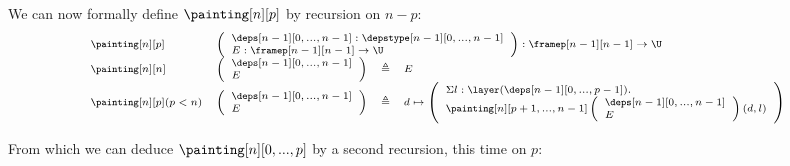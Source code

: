 \documentclass{msc}
\newcommand{\defeq}{\ensuremath{\triangleq}}
\begin{document}
We can now formally define $\painting[n][p]$ by recursion on $n-p$:
\begin{equation*}
  \fontsize{7.2}{9}\selectfont
  \begin{array}{llcl}
    \painting[n][p]          &
    \multicolumn{3}{l}{
      \left(\begin{array}{l}
                \deps[n-1][0,...,n-1]:\depstype[n-1][0,...,n-1] \\
                E:\framep[n-1][n-1]\rightarrow \U               \\
              \end{array}\right) : \framep[n-1][n-1]\rightarrow \U
    }                                                            \\
    \painting[n][n]          &
    \left(\begin{array}{l}
              \deps[n-1][0,...,n-1] \\
              E                     \\
            \end{array}\right) & \defeq & E                        \\
    \painting[n][p](p<n)     &
    \left(\begin{array}{l}
              \deps[n-1][0,...,n-1] \\
              E                     \\
            \end{array}\right) & \defeq & d \mapsto
    \left(\begin{array}{l}
              \Sigma l:\layer(\deps[n-1][0,...,p-1]). \\
              \painting[n][p+1,...,n-1]
              \left(\begin{array}{l}
                  \deps[n-1][0,...,n-1] \\
                  E                     \\
                \end{array}\right)(d,l)           \\
            \end{array}\right) \\
  \end{array}
\end{equation*}

From which we can deduce $\painting[n][0,...,p]$ by a second recursion, this time on $p$:
\end{document}
